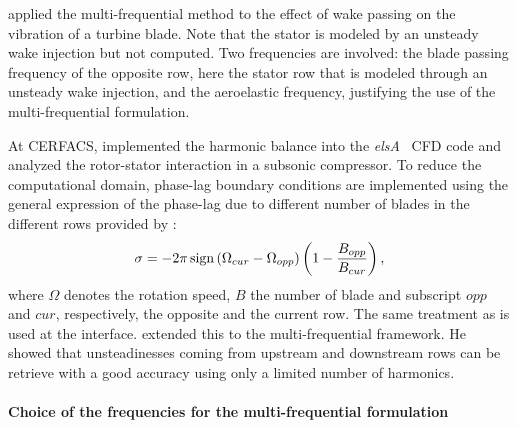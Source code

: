 \citet{Ekici2008a} applied the multi-frequential method
to the effect of wake passing on the vibration of
a turbine blade. Note that the stator is modeled
by an unsteady wake injection but not computed.
Two frequencies are involved: the blade passing
frequency of the opposite row, here the
stator row that is modeled through an unsteady wake injection,
and the aeroelastic frequency, justifying the use
of the multi-frequential formulation.


At CERFACS, \citet{JSicot2012} implemented the harmonic balance 
into the \textit{elsA}~\cite{Cambier2013} CFD code
and analyzed the rotor-stator interaction in a subsonic
compressor. To reduce the computational domain, 
phase-lag boundary conditions are implemented
using the general expression of the phase-lag due to
different number of blades in the different rows 
provided by \citet{Gerolymos1991}:
\begin{equation}
 	\sigma = - 2 \pi \operatorname{sign} \left(\Omega_{cur} - \Omega_{opp} \right) 
 	\left(1 - \frac{B_{opp}}{B_{cur}}\right),
\end{equation} 
where $\Omega$ denotes the rotation speed, $B$ the number
of blade and subscript $opp$ and $cur$, respectively, the
opposite and the current row. The same treatment as \citet{Gopinath2007}
is used at the interface.
\citet{ThesisGuedeney} extended this to the multi-frequential framework.
He showed that unsteadinesses coming from upstream and downstream
rows can be retrieve with a good accuracy using only a limited 
number of harmonics.

\paragraph{Choice of the frequencies for the multi-frequential formulation}
\label{par:choice_of_frequencies}

